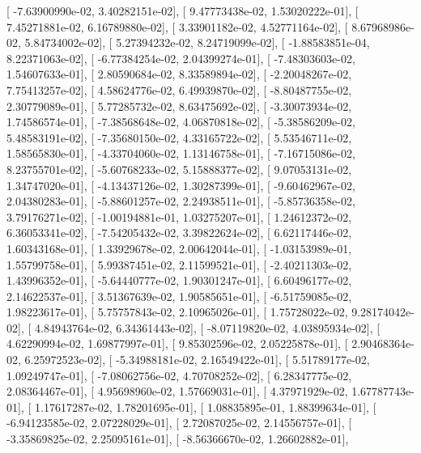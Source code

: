 \documentclass{article}
\begin{document}
       [ -7.63900990e-02,   3.40282151e-02],
       [  9.47773438e-02,   1.53020222e-01],
       [  7.45271881e-02,   6.16789880e-02],
       [  3.33901182e-02,   4.52771164e-02],
       [  8.67968986e-02,   5.84734002e-02],
       [  5.27394232e-02,   8.24719099e-02],
       [ -1.88583851e-04,   8.22371063e-02],
       [ -6.77384254e-02,   2.04399274e-01],
       [ -7.48303603e-02,   1.54607633e-01],
       [  2.80590684e-02,   8.33589894e-02],
       [ -2.20048267e-02,   7.75413257e-02],
       [  4.58624776e-02,   6.49939870e-02],
       [ -8.80487755e-02,   2.30779089e-01],
       [  5.77285732e-02,   8.63475692e-02],
       [ -3.30073934e-02,   1.74586574e-01],
       [ -7.38568648e-02,   4.06870818e-02],
       [ -5.38586209e-02,   5.48583191e-02],
       [ -7.35680150e-02,   4.33165722e-02],
       [  5.53546711e-02,   1.58565830e-01],
       [ -4.33704060e-02,   1.13146758e-01],
       [ -7.16715086e-02,   8.23755701e-02],
       [ -5.60768233e-02,   5.15888377e-02],
       [  9.07053131e-02,   1.34747020e-01],
       [ -4.13437126e-02,   1.30287399e-01],
       [ -9.60462967e-02,   2.04380283e-01],
       [ -5.88601257e-02,   2.24938511e-01],
       [ -5.85736358e-02,   3.79176271e-02],
       [ -1.00194881e-01,   1.03275207e-01],
       [  1.24612372e-02,   6.36053341e-02],
       [ -7.54205432e-02,   3.39822624e-02],
       [  6.62117446e-02,   1.60343168e-01],
       [  1.33929678e-02,   2.00642044e-01],
       [ -1.03153989e-01,   1.55799758e-01],
       [  5.99387451e-02,   2.11599521e-01],
       [ -2.40211303e-02,   1.43996352e-01],
       [ -5.64440777e-02,   1.90301247e-01],
       [  6.60496177e-02,   2.14622537e-01],
       [  3.51367639e-02,   1.90585651e-01],
       [ -6.51759085e-02,   1.98223617e-01],
       [  5.75757843e-02,   2.10965026e-01],
       [  1.75728022e-02,   9.28174042e-02],
       [  4.84943764e-02,   6.34361443e-02],
       [ -8.07119820e-02,   4.03895934e-02],
       [  4.62290994e-02,   1.69877997e-01],
       [  9.85302596e-02,   2.05225878e-01],
       [  2.90468364e-02,   6.25972523e-02],
       [ -5.34988181e-02,   2.16549422e-01],
       [  5.51789177e-02,   1.09249747e-01],
       [ -7.08062756e-02,   4.70708252e-02],
       [  6.28347775e-02,   2.08364467e-01],
       [  4.95698960e-02,   1.57669031e-01],
       [  4.37971929e-02,   1.67787743e-01],
       [  1.17617287e-02,   1.78201695e-01],
       [  1.08835895e-01,   1.88399634e-01],
       [ -6.94123585e-02,   2.07228029e-01],
       [  2.72087025e-02,   2.14556757e-01],
       [ -3.35869825e-02,   2.25095161e-01],
       [ -8.56366670e-02,   1.26602882e-01],
\end{document}
